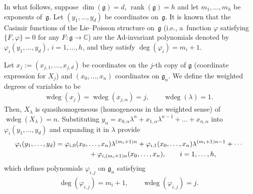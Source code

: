 \documentclass[10pt,a4paper]{amsart}
\numberwithin{equation}{section}
\begin{document}
In what follows, suppose $\dim (\mathfrak{g}) = d$, $\operatorname{rank} (\mathfrak{g}) = h$ and let $m_1 ,\dots ,m_h$ be exponents of~$\mathfrak{g}$.
Let $(y_1,\dots ,y_d)$ be coordinates on~$\mathfrak{g}$. It is known that the Casimir functions of the Lie--Poisson structure on~$\mathfrak{g}$ (i.e., a~function $\varphi $ satisfying $\{ F, \varphi \} = 0$ for any $F\colon \mathfrak{g} \to \mathbb{C}$) are the Ad-invariant polynomials denoted by $\varphi _i (y_1, \dots ,y_d)$, $i=1,\dots ,h$, and they satisfy $\deg (\varphi _i) = m_i + 1$.

Let $x_j := (x_{j,1}, \dots ,x_{j,d})$ be coordinates on the $j$-th copy of $\mathfrak{g}$ (coordinate expression for $X_j$) and $(x_0, \dots ,x_n)$ coordinates on $\mathfrak{g}_n$. We def\/ine the weighted degrees of variables to be
\begin{gather*}
\operatorname{wdeg}(x_j) = \operatorname{wdeg}(x_{j,\alpha }) = j, \qquad \operatorname{wdeg}(\lambda )=1.
\end{gather*}
Then, $X_\lambda $ is quasihomogeneous (homogeneous in the weighted sense) of $\operatorname{wdeg}(X_\lambda ) = n$. Substituting $y_\alpha = x_{0,\alpha }\lambda ^n + x_{1,\alpha }\lambda ^{n-1} + \dots +x_{n,\alpha }$ into $\varphi _i(y_1, \dots ,y_d)$ and expanding it in $\lambda $ provide
\begin{gather*}
\varphi _i(y_1, \dots ,y_d) = \varphi _{i,0}(x_0, \dots ,x_n) \lambda ^{(m_i+1)n}+\varphi _{i,1}(x_0, \dots ,x_n) \lambda ^{(m_i+1)n-1}+ \cdots\\
\hphantom{\varphi _i(y_1, \dots ,y_d) =}{} + \varphi _{i,(m_i+1)n}(x_0, \dots ,x_n), \qquad i=1,\dots ,h,
\end{gather*}
which def\/ines polynomials $\varphi _{i,j}$ on $\mathfrak{g}_n$ satisfying
\begin{gather*}
\deg (\varphi _{i,j}) = m_i+1,\qquad \operatorname{wdeg}(\varphi _{i,j}) = j.
\end{gather*}
\end{document}
